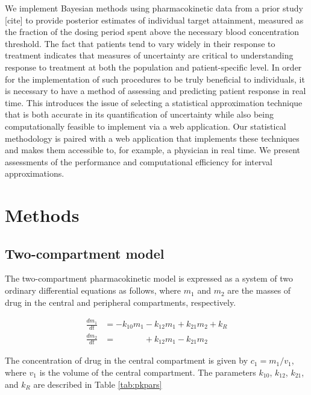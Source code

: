 \documentclass{article}\usepackage[]{graphicx}\usepackage[]{color}
\begin{document}
We implement Bayesian methods using pharmacokinetic data from a prior study [cite] to provide posterior estimates of individual  target attainment, measured as the fraction of the dosing period spent above the necessary blood concentration threshold. The fact that patients tend to vary widely in their response to treatment indicates that measures of uncertainty are critical to understanding response to treatment at both the population and patient-specific level. In order for the implementation of such procedures to be truly beneficial to individuals, it is necessary to have a method of assessing and predicting patient response in real time. This introduces the issue of selecting a statistical approximation technique that is both accurate in its quantification of uncertainty while also being computationally feasible to implement via a web application. Our statistical methodology is paired with a web application that implements these techniques and makes them accessible to, for example, a physician in real time. We present assessments of the performance and computational efficiency for interval approximations.





\section{Methods}
\subsection{Two-compartment model}
The two-compartment pharmacokinetic model is expressed as a system of two ordinary differential equations as follows, where $m_1$ and $m_2$ are the masses of drug in the central and peripheral compartments, respectively.

\begin{align}
\frac{dm_1}{dt} &= -k_{10}m_1 - k_{12}m_1 + k_{21}m_2 + k_R \nonumber \\
\frac{dm_2}{dt} &= \phantom{-k_{10}m_1} + k_{12}m_1 - k_{21}m_2 \nonumber
\end{align}

The concentration of drug in the central compartment is given by $c_1 = m_1/v_1$, where $v_1$ is the volume of the central compartment. The parameters $k_{10}$, $k_{12}$, $k_{21}$, and $k_R$ are described in Table \ref{tab:pkpars}
\end{document}
